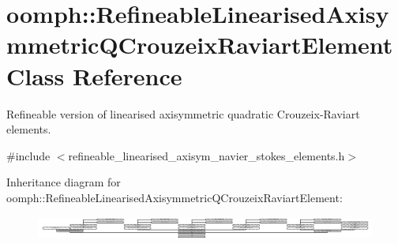\hypertarget{classoomph_1_1RefineableLinearisedAxisymmetricQCrouzeixRaviartElement}{}\section{oomph\+:\+:Refineable\+Linearised\+Axisymmetric\+Q\+Crouzeix\+Raviart\+Element Class Reference}
\label{classoomph_1_1RefineableLinearisedAxisymmetricQCrouzeixRaviartElement}


Refineable version of linearised axisymmetric quadratic Crouzeix-\/\+Raviart elements.  




{\ttfamily \#include $<$refineable\+\_\+linearised\+\_\+axisym\+\_\+navier\+\_\+stokes\+\_\+elements.\+h$>$}

Inheritance diagram for oomph\+:\+:Refineable\+Linearised\+Axisymmetric\+Q\+Crouzeix\+Raviart\+Element\+:\begin{figure}[H]
\begin{center}
\leavevmode
\includegraphics[height=0.766823cm]{classoomph_1_1RefineableLinearisedAxisymmetricQCrouzeixRaviartElement}
\end{center}
\end{figure}
